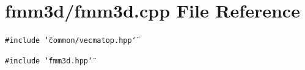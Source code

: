 \section{fmm3d/fmm3d.cpp File Reference}
\label{fmm3d_8cpp}


{\tt \#include \char`\"{}common/vecmatop.hpp\char`\"{}}\par
{\tt \#include \char`\"{}fmm3d.hpp\char`\"{}}\par
